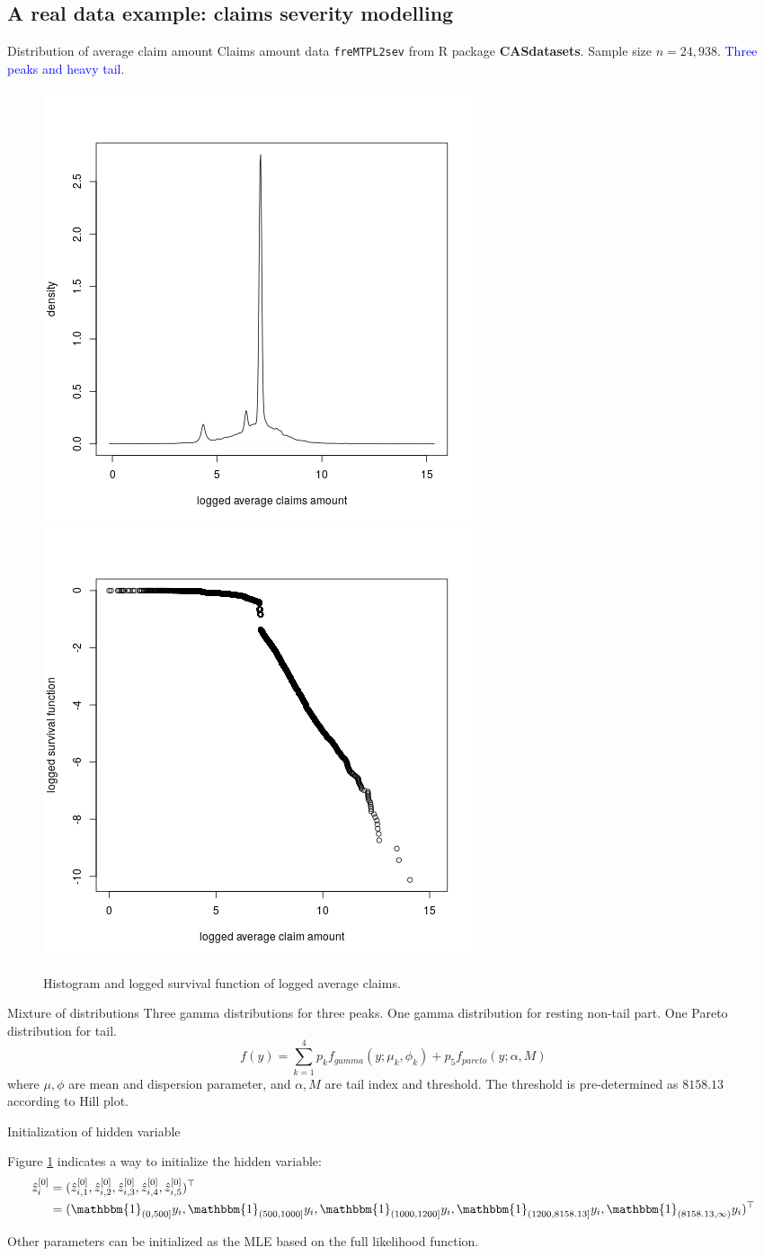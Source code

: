 \documentclass[professionalfont]{beamer}
\newcommand{\blue}[1]{\textcolor{blue}{#1}}
\begin{document}
\subsection{A real data example: claims severity modelling}
\begin{frame}{Distribution of average claim amount}
Claims amount data {\tt freMTPL2sev} from R package {\bf CASdatasets}. Sample size $n=24,938$. \blue{Three peaks and heavy tail}.
\begin{figure}[h!]
	\centering
	\includegraphics[width=0.35\linewidth]{../plots/sev/hist.png}
	\includegraphics[width=0.35\linewidth]{../plots/sev/log-log.png}
	\caption{Histogram and logged survival function of logged average claims.}\label{tail}
\end{figure}
\end{frame}

\begin{frame}{Mixture of distributions}
Three gamma distributions for three peaks. One gamma distribution for resting non-tail part. One Pareto distribution for tail.
$$f(y)=\sum_{k=1}^4p_kf_{gamma}(y;\mu_k,\phi_k)+p_5f_{pareto}(y;\alpha,M)$$
where $\mu,\phi$ are mean and dispersion parameter, and $\alpha, M$ are tail index and threshold. The threshold is pre-determined as $8158.13$ according to Hill plot.
\end{frame}

\begin{frame}{Initialization of hidden variable}

Figure \ref{tail} indicates a way to initialize the hidden variable:
\begin{equation}
	\begin{aligned}
		\hat{z}^{[0]}_i&=(\hat{z}^{[0]}_{i,1},\hat{z}^{[0]}_{i,2},\hat{z}^{[0]}_{i,3},\hat{z}^{[0]}_{i,4},\hat{z}^{[0]}_{i,5})^\top\\
		&=(\mathbbm{1}_{(0,500]}y_i,\mathbbm{1}_{(500, 1000]}y_i,\mathbbm{1}_{(1000,1200]}y_i,\mathbbm{1}_{(1200,8158.13]}y_i,\mathbbm{1}_{(8158.13,\infty)}y_i)^\top
	\end{aligned}
\end{equation}

Other parameters can be initialized as the MLE based on the full likelihood function.

\end{frame}
\end{document}
